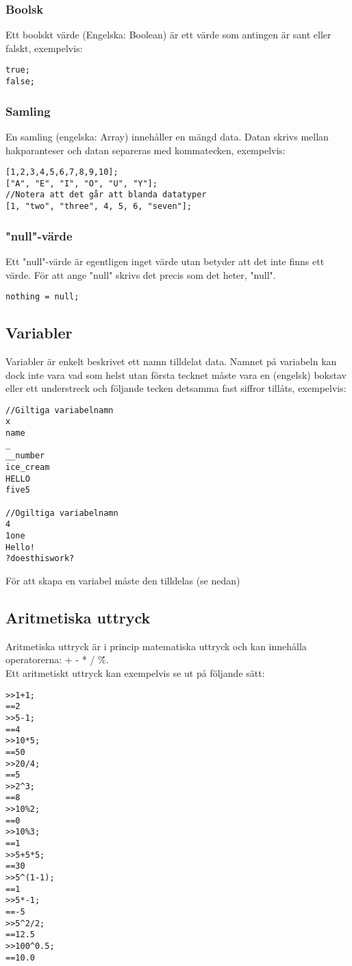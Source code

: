 \documentclass{TDP003mall}
\begin{document}
\subsubsection{Boolsk}
Ett boolskt värde (Engelska: Boolean) är ett värde som antingen är sant eller falskt, exempelvis:
\begin{lstlisting}
true;
false;
\end{lstlisting}

\subsubsection{Samling}
En samling (engelska: Array) innehåller en mängd data. Datan skrivs mellan hakparanteser och datan separeras med kommatecken, exempelvis:
\begin{lstlisting}
[1,2,3,4,5,6,7,8,9,10];
["A", "E", "I", "O", "U", "Y"];
//Notera att det går att blanda datatyper
[1, "two", "three", 4, 5, 6, "seven"];
\end{lstlisting}

\subsubsection{"null"-värde}
Ett "null"-värde är egentligen inget värde utan betyder att det inte finns ett värde. För att ange "null" skrivs det precis som det heter, "null".
\begin{lstlisting}
nothing = null;
\end{lstlisting}
\newpage

\subsection{Variabler}
Variabler är enkelt beskrivet ett namn tilldelat data. Namnet på variabeln kan dock inte vara vad som helst utan första tecknet måste vara en (engelsk) bokstav eller ett understreck och följande tecken detsamma fast siffror tillåts, exempelvis:
\begin{lstlisting}
//Giltiga variabelnamn
x
name
_
__number
ice_cream
HELLO
five5

//Ogiltiga variabelnamn
4
1one
Hello!
?doesthiswork?
\end{lstlisting}
För att skapa en variabel måste den tilldelas (se nedan)

\subsection{Aritmetiska uttryck}
Aritmetiska uttryck är i princip matematiska uttryck och kan innehålla operatorerna: + - * / \^ \%.
\\
Ett aritmetiskt uttryck kan exempelvis se ut på följande sätt:
\begin{lstlisting}
>>1+1;
==2
>>5-1;
==4
>>10*5;
==50
>>20/4;
==5
>>2^3;
==8
>>10%2;
==0
>>10%3;
==1
>>5+5*5;
==30
>>5^(1-1);
==1
>>5*-1;
==-5
>>5^2/2;
==12.5
>>100^0.5;
==10.0
\end{lstlisting}
\end{document}
